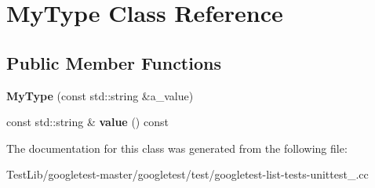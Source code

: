 \hypertarget{classMyType}{}\section{My\+Type Class Reference}
\label{classMyType}
\subsection*{Public Member Functions}
\begin{DoxyCompactItemize}
\item 
\mbox{\label{classMyType_a74d6f29a06e298321a6e5f0b91b020e7}} 
{\bfseries My\+Type} (const std\+::string \&a\+\_\+value)
\item 
\mbox{\label{classMyType_a04eaace57f0ecd8ee8898defbdee31b4}} 
const std\+::string \& {\bfseries value} () const
\end{DoxyCompactItemize}


The documentation for this class was generated from the following file\+:\begin{DoxyCompactItemize}
\item 
Test\+Lib/googletest-\/master/googletest/test/googletest-\/list-\/tests-\/unittest\+\_\+.\+cc\end{DoxyCompactItemize}
